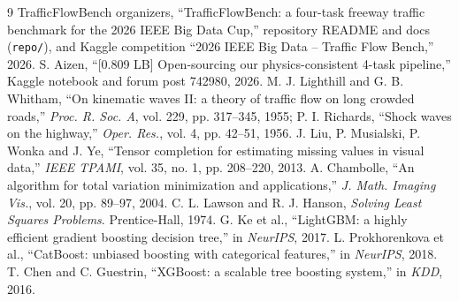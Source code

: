 \documentclass[conference,10pt]{IEEEtran}
\newcommand{\file}[1]{\texttt{\small #1}}
\begin{document}
\begin{thebibliography}{9}
 TrafficFlowBench organizers, ``TrafficFlowBench: a four-task freeway traffic benchmark for the 2026 IEEE Big Data
Cup,'' repository README and docs (\file{repo/}), and Kaggle competition ``2026 IEEE Big Data -- Traffic Flow Bench,'' 2026.
 S. Aizen, ``[0.809 LB] Open-sourcing our physics-consistent 4-task pipeline,'' Kaggle notebook and forum
post 742980, 2026.
 M. J. Lighthill and G. B. Whitham, ``On kinematic waves II: a theory of traffic flow on long crowded roads,''
\emph{Proc. R. Soc. A}, vol. 229, pp. 317--345, 1955; P. I. Richards, ``Shock waves on the highway,'' \emph{Oper. Res.}, vol. 4,
pp. 42--51, 1956.
 J. Liu, P. Musialski, P. Wonka and J. Ye, ``Tensor completion for estimating missing values in visual data,''
\emph{IEEE TPAMI}, vol. 35, no. 1, pp. 208--220, 2013.
 A. Chambolle, ``An algorithm for total variation minimization and applications,'' \emph{J. Math. Imaging
Vis.}, vol. 20, pp. 89--97, 2004.
 C. L. Lawson and R. J. Hanson, \emph{Solving Least Squares Problems}. Prentice-Hall, 1974.
 G. Ke et al., ``LightGBM: a highly efficient gradient boosting decision tree,'' in \emph{NeurIPS}, 2017.
 L. Prokhorenkova et al., ``CatBoost: unbiased boosting with categorical features,'' in \emph{NeurIPS}, 2018.
 T. Chen and C. Guestrin, ``XGBoost: a scalable tree boosting system,'' in \emph{KDD}, 2016.
\end{thebibliography}
\end{document}
